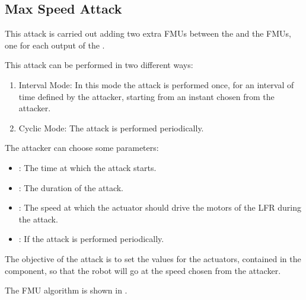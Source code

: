 \subsection{Max Speed Attack}

This attack is carried out adding two extra FMUs between the 
and the  FMUs, one for each output of the .

This attack can be performed in two different ways:

\begin{enumerate}
	\item Interval Mode: In this mode the attack is performed once, for an
		interval of time defined by the attacker, starting from an
		instant chosen from the attacker.
	\item Cyclic Mode: The attack is performed periodically.
\end{enumerate}

The attacker can choose some parameters:

\begin{itemize}
	\item {}: The time at which the attack starts.
	\item {}: The duration of the attack.
	\item {}: The speed at which the actuator should
		drive the motors of the LFR during the attack.
	\item {}: If  the attack is performed
		periodically.
\end{itemize}

The objective of the attack is to set the values for the actuators, contained in
the  component, so that the robot will go at the speed chosen from
the attacker.

The FMU algorithm is shown in .


